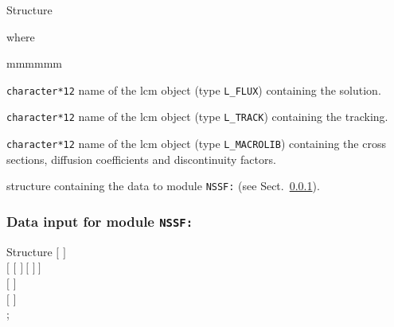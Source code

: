 \begin{DataStructure}{Structure }
 \moc{:=}    \moc{::} 
\end{DataStructure}

\noindent where
\begin{ListeDeDescription}{mmmmmm}

\item[\dusa{FLUX}] {\tt character*12} name of the {\sc lcm} object (type {\tt L\_FLUX}) containing the solution.

\item[\dusa{TRACK}] {\tt character*12} name of the {\sc lcm} object (type {\tt L\_TRACK}) containing the {\sc tracking}.

\item[\dusa{MACRO}] {\tt character*12} name of the {\sc lcm} object (type {\tt L\_MACROLIB}) containing the cross sections, diffusion coefficients and discontinuity
factors.

\item[\dstr{NSSF\_data}] structure containing the data to module {\tt NSSF:} (see Sect.~\ref{sect:fld_data}).

\end{ListeDeDescription}

\vskip 0.2cm

\subsubsection{Data input for module {\tt NSSF:}}\label{sect:fld_data}

\begin{DataStructure}{Structure }
$[$   $]$ \\
$[$   $[$  $]~[$  $]~]$ \\
$[$  $]$ \\
$[$   $]$  \\
;
\end{DataStructure}

